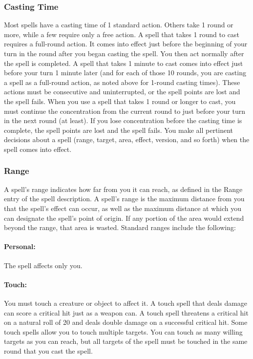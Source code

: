 \subsubsection{Casting Time}
Most spells have a casting time of 1 standard action. Others take 1 round or more, while a few require only a free action.
A spell that takes 1 round to cast requires a full-round action. 
It comes into effect just before the beginning of your turn in the round after you began casting the spell. 
You then act normally after the spell is completed. 
A spell that takes 1 minute to cast comes into effect just before your turn 1 minute later (and for each of those 10 rounds, you are casting a spell as a full-round action, as noted above for 1-round casting times). 
These actions must be consecutive and uninterrupted, or the spell points are lost and the spell fails.
When you use a spell that takes 1 round or longer to cast, you must continue the concentration from the current round to just before your turn in the next round (at least). 
If you lose concentration before the casting time is complete, the spell points are lost and the spell fails.
You make all pertinent decisions about a spell (range, target, area, effect, version, and so forth) when the spell comes into effect.

\subsubsection{Range}
A spell's range indicates how far from you it can reach, as defined in the Range entry of the spell description. 
A spell's range is the maximum distance from you that the spell's effect can occur, as well as the maximum distance at which you can designate the spell's point of origin. 
If any portion of the area would extend beyond the range, that area is wasted. Standard ranges include the following:

\paragraph{Personal:} The spell affects only you.

\paragraph{Touch:} You must touch a creature or object to affect it. A touch spell that deals damage can score a critical hit just as a weapon can. 
A touch spell threatens a critical hit on a natural roll of 20 and deals double damage on a successful critical hit. 
Some touch spells allow you to touch multiple targets. 
You can touch as many willing targets as you can reach, but all targets of the spell must be touched in the same round that you cast the spell.

